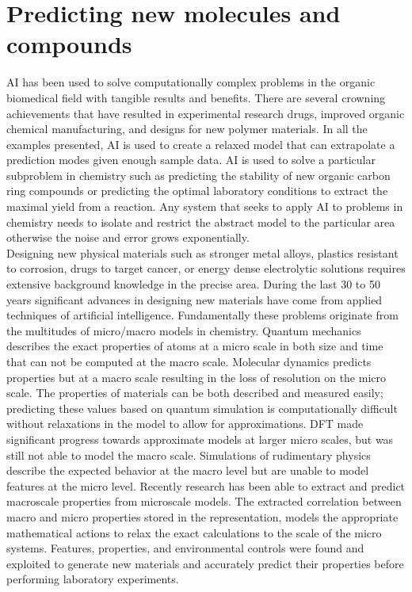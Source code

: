 \documentclass{article}
\begin{document}
\section{Predicting new molecules and compounds}
AI has been used to solve computationally complex problems in the organic biomedical field with tangible results and benefits.  There are several crowning achievements that have resulted in experimental research drugs, improved organic chemical manufacturing, and designs for new polymer materials. In all the examples presented, AI is used to create a relaxed model that can extrapolate a prediction modes given enough sample data. AI is used to solve a particular subproblem in chemistry such as predicting the stability of new organic carbon ring compounds or predicting the optimal laboratory conditions to extract the maximal yield from a reaction. Any system that seeks to apply AI to problems in chemistry needs to isolate and restrict the abstract model to the particular area otherwise the noise and error grows exponentially. \\

Designing new physical materials such as stronger metal alloys, plastics resistant to corrosion, drugs to target cancer, or energy dense electrolytic solutions requires extensive background knowledge in the precise area. During the last 30 to 50 years significant advances in designing new materials have come from applied techniques of artificial intelligence. Fundamentally these problems originate from the multitudes of micro/macro models in chemistry. Quantum mechanics describes the exact properties of atoms at a micro scale in both size and time that can not be computed at the macro scale. Molecular dynamics predicts properties but at a macro scale resulting in the loss of resolution on the micro scale. The properties of materials can be both described and measured easily; predicting these values based on quantum simulation is computationally difficult without relaxations in the model to allow for approximations. DFT made significant progress towards approximate models at larger micro scales, but was still not able to model the macro scale. Simulations of rudimentary physics describe the expected behavior at the macro level but are unable to model features at the micro level. Recently research has been able to extract and predict macroscale properties from microscale models. The extracted correlation between macro and micro properties stored in the representation, models the appropriate mathematical actions to relax the exact calculations to the scale of the micro systems. \cite{HEURISTIC}  Features, properties, and environmental controls were found and exploited to generate new materials and accurately predict their properties before performing laboratory experiments.  \cite{PROPERTIES} \\ 
\end{document}
